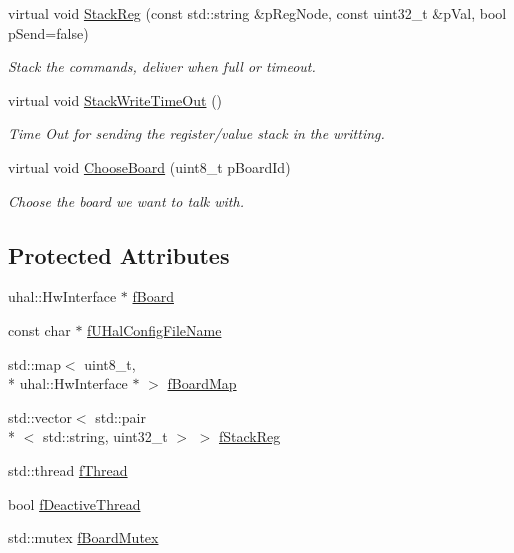 \begin{DoxyCompactItemize}
virtual void \hyperlink{class_ph2___hw_interface_1_1_reg_manager_a409c95948e25ea5fb7f897926e9de1e6}{Stack\-Reg} (const std\-::string \&p\-Reg\-Node, const uint32\-\_\-t \&p\-Val, bool p\-Send=false)
\begin{DoxyCompactList}\small\item\em Stack the commands, deliver when full or timeout. \end{DoxyCompactList}\item 
virtual void \hyperlink{class_ph2___hw_interface_1_1_reg_manager_ab4e24cf318772c09a6c7e24b88b1dedb}{Stack\-Write\-Time\-Out} ()
\begin{DoxyCompactList}\small\item\em Time Out for sending the register/value stack in the writting. \end{DoxyCompactList}\item 
virtual void \hyperlink{class_ph2___hw_interface_1_1_reg_manager_a20c502bcad5115c6ae16d4d356b72f0c}{Choose\-Board} (uint8\-\_\-t p\-Board\-Id)
\begin{DoxyCompactList}\small\item\em Choose the board we want to talk with. \end{DoxyCompactList}\end{DoxyCompactItemize}
\subsection*{Protected Attributes}
\begin{DoxyCompactItemize}
\item 
uhal\-::\-Hw\-Interface $\ast$ \hyperlink{class_ph2___hw_interface_1_1_reg_manager_a0d4908ec834a3a0b7d8139872fd0a4a0}{f\-Board}
\item 
const char $\ast$ \hyperlink{class_ph2___hw_interface_1_1_reg_manager_aaaa29ca65c283acc645132c7bef0f24f}{f\-U\-Hal\-Config\-File\-Name}
\item 
std\-::map$<$ uint8\-\_\-t, \\*
uhal\-::\-Hw\-Interface $\ast$ $>$ \hyperlink{class_ph2___hw_interface_1_1_reg_manager_a9c34ffe467a572796c05036533bb6d39}{f\-Board\-Map}
\item 
std\-::vector$<$ std\-::pair\\*
$<$ std\-::string, uint32\-\_\-t $>$ $>$ \hyperlink{class_ph2___hw_interface_1_1_reg_manager_a42f9437febcc01def682f69714e609ee}{f\-Stack\-Reg}
\item 
std\-::thread \hyperlink{class_ph2___hw_interface_1_1_reg_manager_a3aa2f1c4769f122a2e902f2d70865b30}{f\-Thread}
\item 
bool \hyperlink{class_ph2___hw_interface_1_1_reg_manager_ae337041a55b10db74bbd8e171424807a}{f\-Deactive\-Thread}
\item 
std\-::mutex \hyperlink{class_ph2___hw_interface_1_1_reg_manager_ab5fdbe722820897d3a1344f300cc4a92}{f\-Board\-Mutex}
\end{DoxyCompactItemize}


